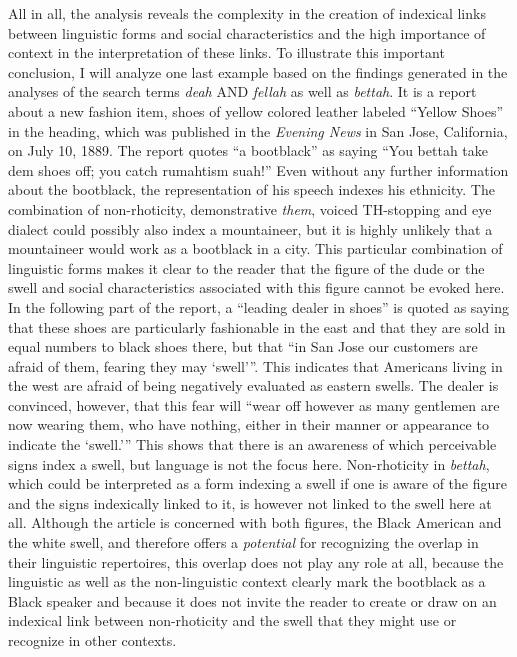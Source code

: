 All in all, the analysis reveals the complexity in the creation of indexical links between linguistic forms and social characteristics and the high importance of context in the interpretation of these links. To illustrate this important conclusion, I will analyze one last example based on the findings generated in the analyses of the search terms \emph{deah} AND \emph{fellah} as well as \emph{bettah}. It is a report about a new fashion item, shoes of yellow colored leather labeled “Yellow Shoes” in the heading, which was published in the \emph{Evening News} in San Jose, California, on July 10, 1889. The report quotes “a bootblack” as saying “You bettah take dem shoes off; you catch rumahtism suah!” Even without any further information about the bootblack, the representation of his speech indexes his ethnicity. The combination of non-rhoticity, demonstrative \emph{them}, voiced TH-stopping and eye dialect could possibly also index a mountaineer, but it is highly unlikely that a mountaineer would work as a bootblack in a city. This particular combination of linguistic forms makes it clear to the reader that the figure of the dude or the swell and social characteristics associated with this figure cannot be evoked here. In the following part of the report, a “leading dealer in shoes” is quoted as saying that these shoes are particularly fashionable in the east and that they are sold in equal numbers to black shoes there, but that “in San Jose our customers are afraid of them, fearing they may ‘swell’”. This indicates that Americans living in the west are afraid of being negatively evaluated as eastern swells. The dealer is convinced, however, that this fear will “wear off however as many gentlemen are now wearing them, who have nothing, either in their manner or appearance to indicate the ‘swell.’” This shows that there is an awareness of which perceivable signs index a swell, but language is not the focus here. Non-rhoticity in \emph{bettah}, which could be interpreted as a form indexing a swell if one is aware of the figure and the signs indexically linked to it, is however not linked to the swell here at all. Although the article is concerned with both figures, the Black American and the white swell, and therefore offers a \emph{potential} for recognizing the overlap in their linguistic repertoires, this overlap does not play any role at all, because the linguistic as well as the non-linguistic context clearly mark the bootblack as a Black speaker and because it does not invite the reader to create or draw on an indexical link between non-rhoticity and the swell that they might use or recognize in other contexts.

